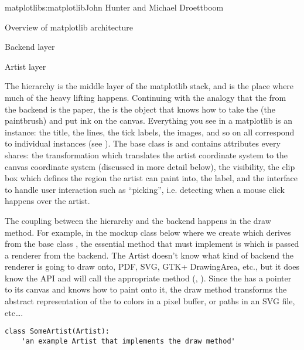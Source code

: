 \begin{aosachapter}{matplotlib}{s:matplotlib}{John Hunter and Michael Droettboom}
\begin{aosasect1}{Overview of matplotlib architecture}
\begin{aosasect2}{Backend layer}

\end{aosasect2}

\begin{aosasect2}{Artist layer}

The  hierarchy is the middle layer of the matplotlib
stack, and is the place where much of the heavy lifting happens.
Continuing with the analogy that the  from the
backend is the paper, the  is the object that knows how
to take the  (the paintbrush) and put ink on the
canvas.  Everything you see in a matplotlib  is an
 instance: the title, the lines, the tick labels, the
images, and so on all correspond to individual  instances
(see ).  The base class is
 and contains attributes every
 shares: the transformation which translates the artist
coordinate system to the canvas coordinate system (discussed in more
detail below), the visibility, the clip box which defines the region
the artist can paint into, the label, and the interface to handle user
interaction such as ``picking'', i.e. detecting when a mouse click
happens over the artist.



The coupling between the  hierarchy and the backend
happens in the draw method.  For example, in the mockup class below
where we create  which derives from the base class
, the essential method that  must
implement is  which is passed a renderer from the backend.
The Artist doesn't know what kind of backend the renderer is going to
draw onto, PDF, SVG, GTK+ DrawingArea, etc., but it does know the
 API and will call the appropriate method
(, ).  Since the  has
a pointer to its canvas and knows how to paint onto it, the draw
method transforms the abstract representation of the  to
colors in a pixel buffer, or paths in an SVG file, etc\dots{}.

\begin{verbatim}
class SomeArtist(Artist):
    'an example Artist that implements the draw method'


\end{verbatim}
\end{aosasect2}
\end{aosasect1}
\end{aosachapter}
